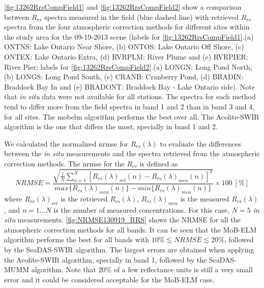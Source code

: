 \autoref{fig:13262RrsCompField1} and \autoref{fig:13262RrsCompField2} show a comparison between $R_{rs}$ spectra measured in the field (blue dashed line) with retrieved $R_{rs}$ spectra from the four atmospheric correction methods for different sites within the study area for the 09-19-2013 scene (labels for \autoref{fig:13262RrsCompField1}.(a) ONTNS: Lake Ontario Near Shore, (b) ONTOS: Lake Ontario Off Shore, (c) ONTEX: Lake Ontario Extra, (d) RVRPLM: River Plume and (e) RVRPIER: River Pier; labels for \autoref{fig:13262RrsCompField2}.(a) LONGN: Long Pond North, (b) LONGS: Long Pond South, (c) CRANB: Cranberry Pond, (d) BRADIN: Braddock Bay In and (e) BRADONT: Braddock Bay - Lake Ontario side). Note that {\it in situ} data were not available for all stations. The spectra for each method tend to differ more from the field spectra in band 1 and 2 than in band 3 and 4, for all sites. The \gls{mobelm} algorithm performs the best over all. The Acolite-SWIR algorithm is the one that differs the most, specially in band 1 and 2. 

We calculated the normalized \acrfull{nrmse} for $R_{rs}(\lambda)$ to evaluate the differences between the {\it in situ} measurements and the spectra retrieved from the atmospheric correction methods. The \gls{nrmse} for the $R_{rs}$ is defined as
\begin{equation}
\label{eq:NRMSE}
  NRMSE =\frac{\sqrt{\frac{1}{N}\sum_{n=1}^N{\left[R_{rs}(\lambda)_{ret}(n) - R_{rs}(\lambda)_{mea}(n)\right]^2}}}{max\{R_{rs}(\lambda)_{mea}(n)\} - min\{R_{rs}(\lambda)_{mea}(n)\}}\times100 ~[\%]
\end{equation}
\noindent where $R_{rs}(\lambda)_{ret}$ is the retrieved $R_{rs}(\lambda)$, $R_{rs}(\lambda)_{mea}$ is the measured $R_{rs}(\lambda)$, and $n=1\dots N$ is the number of measured concentrations. For this case, $N=5$ {\it in situ} measurements. \autoref{fig:NRMSE130919_RRS} shows the NRMSE for all the atmospheric correction methods for all bands. It can be seen that the MoB-ELM algorithm performs the best for all bands with  $10\%\lesssim NRMSE \lesssim 20\%$, followed by the SeaDAS-SWIR algorithm. The largest errors are obtained when applying the Acolite-SWIR algorithm, specially in band 1, followed by the SeaDAS-MUMM algorithm. Note that $20\%$ of a few reflectance units is still a very small error and it could be considered acceptable for the MoB-ELM case.



